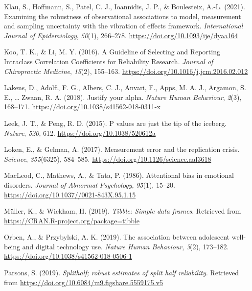 \documentclass[
  man,floatsintext]{apa6}
\newlength{\cslhangindent}
\newlength{\cslentryspacingunit} %
\newenvironment{CSLReferences}[2] %
 {%
  \setlength{\parindent}{0pt}
  \ifodd #1
  \let\oldpar\par
  \def\par{\hangindent=\cslhangindent\oldpar}
  \fi
  \setlength{\parskip}{#2\cslentryspacingunit}
 }%
 {}
\begin{document}
\begin{CSLReferences}{1}{0}
\leavevmode{}%
Klau, S., Hoffmann, S., Patel, C. J., Ioannidis, J. P., \& Boulesteix, A.-L. (2021). Examining the robustness of observational associations to model, measurement and sampling uncertainty with the vibration of effects framework. \emph{International Journal of Epidemiology}, \emph{50}(1), 266--278. \url{https://doi.org/10.1093/ije/dyaa164}

\leavevmode{}%
Koo, T. K., \& Li, M. Y. (2016). A {Guideline} of {Selecting} and {Reporting} {Intraclass} {Correlation} {Coefficients} for {Reliability} {Research}. \emph{Journal of Chiropractic Medicine}, \emph{15}(2), 155--163. \url{https://doi.org/10.1016/j.jcm.2016.02.012}

\leavevmode{}%
Lakens, D., Adolfi, F. G., Albers, C. J., Anvari, F., Apps, M. A. J., Argamon, S. E., \ldots{} Zwaan, R. A. (2018). Justify your alpha. \emph{Nature Human Behaviour}, \emph{2}(3), 168--171. \url{https://doi.org/10.1038/s41562-018-0311-x}

\leavevmode{}%
Leek, J. T., \& Peng, R. D. (2015). P values are just the tip of the iceberg. \emph{Nature}, \emph{520}, 612. \url{https://doi.org/10.1038/520612a}

\leavevmode{}%
Loken, E., \& Gelman, A. (2017). Measurement error and the replication crisis. \emph{Science}, \emph{355}(6325), 584--585. \url{https://doi.org/10.1126/science.aal3618}

\leavevmode{}%
MacLeod, C., Mathews, A., \& Tata, P. (1986). Attentional bias in emotional disorders. \emph{Journal of Abnormal Psychology}, \emph{95}(1), 15--20. \url{https://doi.org/10.1037//0021-843X.95.1.15}

\leavevmode{}%
Müller, K., \& Wickham, H. (2019). \emph{Tibble: Simple data frames}. Retrieved from \url{https://CRAN.R-project.org/package=tibble}

\leavevmode{}%
Orben, A., \& Przybylski, A. K. (2019). The association between adolescent well-being and digital technology use. \emph{Nature Human Behaviour}, \emph{3}(2), 173--182. \url{https://doi.org/10.1038/s41562-018-0506-1}

\leavevmode{}%
Parsons, S. (2019). \emph{Splithalf; robust estimates of split half reliability}. Retrieved from \url{https://doi.org/10.6084/m9.figshare.5559175.v5}


\end{CSLReferences}
\end{document}

